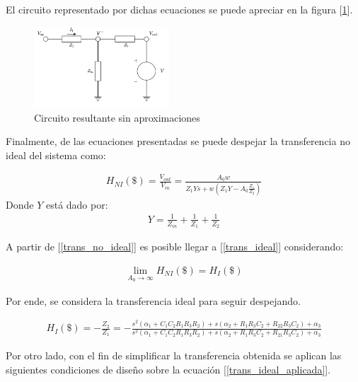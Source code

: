 El circuito representado por dichas ecuaciones se puede apreciar 
en la figura [\ref{circuito_no_ideal}]. \par 
\begin{figure}[h]
	\centering
	\includegraphics[width=0.45\textwidth]{../Ejercicio4-EcualizadorDeFase/Informe/circuito_no_ideal.png}
	\caption{Circuito resultante sin aproximaciones}
	\label{circuito_no_ideal}
\end{figure}


Finalmente, de las ecuaciones presentadas se puede despejar la transferencia 
no ideal del sistema como:

\begin{align}
	H_{NI}(\$)=\frac{V_{out}}{V_{in}}=\frac{A_0w}{Z_{1}Ys+w(Z_1Y-A_0\frac{Z_1}{Z_2})}
	\label{trans_no_ideal}
\end{align}
 \vspace{2mm}
Donde $Y$ está dado por:
\begin{align}
	Y=\frac{1}{Z_{in}}+\frac{1}{Z_1}+\frac{1}{Z_2}
	\label{Y}
\end{align}
 \vspace{2mm}

 A partir de [\ref{trans_no_ideal}] es posible llegar a [\ref{trans_ideal}] considerando:

 \begin{align}
	\lim_{A_0\to\infty} H_{NI}(\$) = H_{I}(\$)
	\label{Y}
\end{align}
 \vspace{2mm}

 Por ende, se considera la transferencia ideal para seguir despejando.

\begin{align}
	H_I(\$)=-\frac{Z_{2}}{Z_{1}}=-\frac{s^2(\alpha_1+C_1C_2R_1R_3R_2)+s(\alpha_2+R_1R_3C_2+R_{22}R_3C_2)+\alpha_3}{s^2(\alpha_1+C_1C_2R_1R_3R_2)+s(\alpha_2+R_1R_3C_2+R_{21}R_3C_2)+\alpha_3}
	\label{trans_ideal_aplicada}
\end{align}

 Por otro lado, con el fin de simplificar la transferencia obtenida
 se aplican las siguientes condiciones de diseño sobre la 
 ecuación [\ref{trans_ideal_aplicada}].

